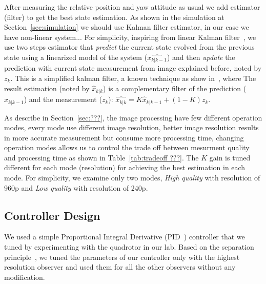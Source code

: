 \documentclass{sig-alternate-ipsn13}
\begin{document}
After measuring the relative position and yaw attitude as usual we add estimator (filter) to get the best state estimation. 
As shown in the simulation at Section~\ref{sec:simulation} we should use Kalman filter estimator, in our case we have non-linear system... %
For simplicity, inspiring from linear Kalman filter~\cite{??? kalman}, we use two steps estimator that \textit{predict} the current state evolved from the previous state using a linearized model of the system ($\hat{x_{k|k-1}}$) and then \textit{update} the prediction with current state measurement from image explained before, noted by $z_k$.
This is a simplified kalman filter, a known technique as show in~\cite{??? kalman vs CF}, where The result estimation (noted by $\hat{x}_{k|k}$) is a complementary filter of the prediction ($\hat{x}_{k|k-1}$) and the measurement ($z_k$):
$ \hat{x_{k|k}} = K \hat{x}_{k|k-1} + (1-K) z_k $.










As describe in Section~\ref{sec:???}, the image processing have few different operation modes, every mode use different image resolution, better image resolution results in more accurate measurement but consume more processing time, changing operation modes allows us to control the trade off between mesurment quality and processing time as shown in Table~\ref{tab:tradeoff ???}.
The $K$ gain is tuned different for each mode (resolution) for achieving the best estimation in each mode.
For simplicity, we examine only two modes, \textit{High quality} with resolution of 960p and \textit{Low quality} with resolution of 240p.

\subsection{Controller Design}
We used a simple Proportional Integral Derivative (PID~\cite{aastrom2006advanced}) controller that we tuned by experimenting with the quadrotor in our lab. Based on the separation principle~\cite{?}, we tuned the parameters of our controller only with the highest resolution observer and used them for all the other observers without any modification.
\end{document}
